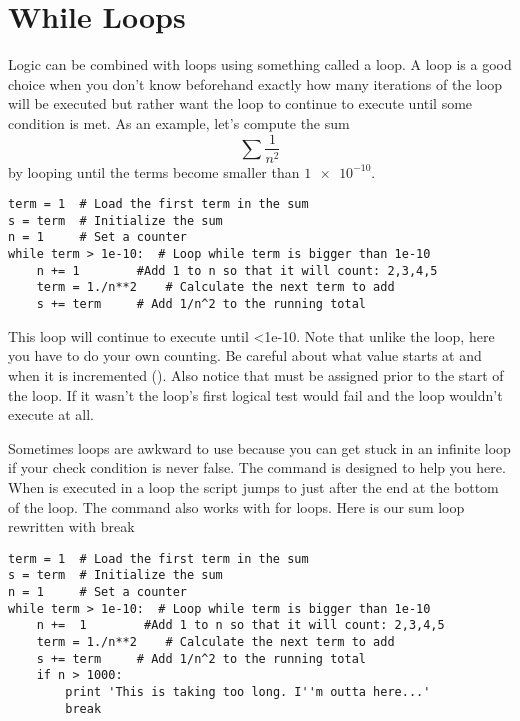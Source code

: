 \section{While Loops}
Logic can be combined with loops using something called a
 loop.  A  loop is a good choice when you
don't know beforehand exactly how many iterations of the loop will be
executed but rather want the loop to continue to execute until some
condition is met.  As an example, let's compute the sum
\begin{equation}\label{eq:sum}
\sum \frac{1}{n^2}
\end{equation}
by looping until the terms become smaller than $\num{1e-10}$.
\begin{Verbatim}
term = 1  # Load the first term in the sum
s = term  # Initialize the sum
n = 1     # Set a counter
while term > 1e-10:  # Loop while term is bigger than 1e-10
    n += 1        #Add 1 to n so that it will count: 2,3,4,5
    term = 1./n**2    # Calculate the next term to add
    s += term     # Add 1/n^2 to the running total
\end{Verbatim}
This loop will continue to execute until <1e-10. Note
that unlike the  loop, here you have to do your own counting. Be
careful about what value  starts at and when it is incremented
(). Also notice that  must be assigned
prior to the start of the loop.  If it wasn't the loop's first logical
test would fail and the loop wouldn't execute at all.

Sometimes  loops are awkward to use because you can get
stuck in an infinite loop if your check condition is never false. The
 command is designed to help you here. When
 is executed in a loop the script jumps to just after
the end at the bottom of the loop. The  command also
works with for loops. Here is our sum loop rewritten with break
\begin{Verbatim}
term = 1  # Load the first term in the sum
s = term  # Initialize the sum
n = 1     # Set a counter
while term > 1e-10:  # Loop while term is bigger than 1e-10
    n +=  1        #Add 1 to n so that it will count: 2,3,4,5
    term = 1./n**2    # Calculate the next term to add
    s += term     # Add 1/n^2 to the running total
    if n > 1000:
        print 'This is taking too long. I''m outta here...'
        break
\end{Verbatim}

